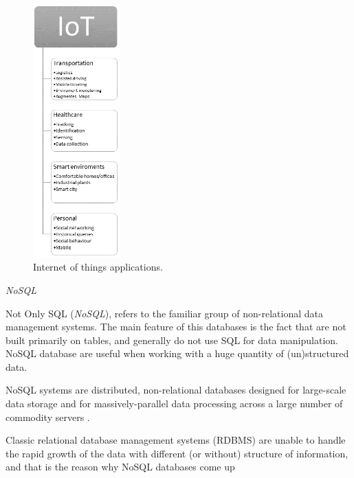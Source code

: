 \begin{figure}[H] %
\label{fig:iotbigdata}
	\vspace{0.5cm} \centering \includegraphics[width=0.30\textwidth,height=0.49\textheight]{figures/bigData/iot.png}
	\caption{Internet of things applications.}\vspace{0.5cm}
\end{figure}


\emph{NoSQL}


Not Only SQL (\textit{NoSQL}), refers to the familiar group of non-relational data management systems. The main feature of this databases is the fact that are not built primarily on tables, and generally do not use SQL for data manipulation. NoSQL database are useful when working with a huge quantity of (un)structured data.

NoSQL systems are distributed, non-relational databases designed for large-scale data storage and for massively-parallel data processing across a large number of commodity servers \cite{moniruzzaman2013nosql}.

Classic relational database management systems (RDBMS) are unable to handle the rapid growth of the data with different (or without) structure of information, and that is the reason why NoSQL databases come up

